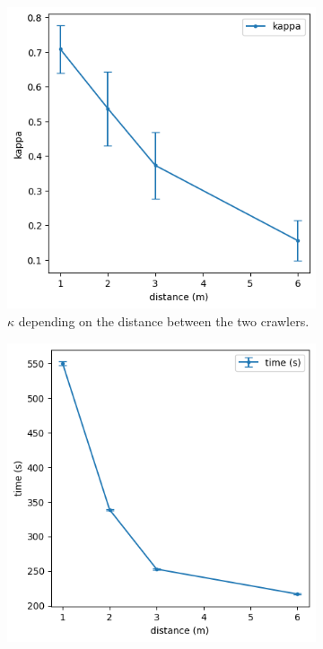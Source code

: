 \documentclass[english,RandD]{rapportPFE}  %
\begin{document}
			\begin{figure}[h!]
				\begin{subfigure}[t]{0.49\linewidth}
					\includegraphics[width=\linewidth]{graphics/peinture_au_rouleau-kappa_vs_distance.png}
					\caption{$\kappa$ depending on the distance between the two crawlers.}
					\label{fig:peinture_au_rouleau-kappa_vs_distance}
				\end{subfigure}
				\hfill
				\begin{subfigure}[t]{0.49\linewidth}
						\includegraphics[width=\linewidth]{graphics/peinture_au_rouleau-time_vs_distance.png}

\end{subfigure}
\end{figure}
\end{document}
